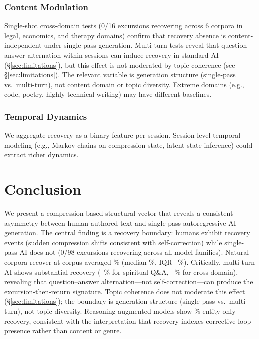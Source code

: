 \documentclass[final]{clv2025}
\begin{document}
\subsubsection{Content Modulation}

Single-shot cross-domain tests (0/16 excursions recovering across 6 corpora in legal, economics, and therapy domains) confirm that recovery absence is content-independent under single-pass generation. Multi-turn tests reveal that question--answer alternation within sessions can induce recovery in standard AI (\S\ref{sec:limitations}), but this effect is not moderated by topic coherence (see \S\ref{sec:limitations}). The relevant variable is generation structure (single-pass vs.\ multi-turn), not content domain or topic diversity. Extreme domains (e.g., code, poetry, highly technical writing) may have different baselines.

\subsubsection{Temporal Dynamics}

We aggregate recovery as a binary feature per session. Session-level temporal modeling (e.g., Markov chains on compression state, latent state inference) could extract richer dynamics.


\section{Conclusion}

We present a compression-based structural vector that reveals a consistent asymmetry between human-authored text and single-pass autoregressive AI generation. The central finding is a recovery boundary: humans exhibit recovery events (sudden compression shifts consistent with self-correction) while single-pass AI does not (0/98 excursions recovering across all model families). Natural corpora recover at corpus-averaged \recNatCorpusAvg\% (median \recNatMedian\%, IQR \recNatIQRlo--\recNatIQRhi\%). Critically, multi-turn AI shows substantial recovery (\recClaudeMT--\recGPTMT\% for spiritual Q\&A, \recMTXdomMin--\recMTXdomMax\% for cross-domain), revealing that question--answer alternation---not self-correction---can produce the excursion-then-return signature. Topic coherence does not moderate this effect (\S\ref{sec:limitations}); the boundary is generation structure (single-pass vs.\ multi-turn), not topic diversity. Reasoning-augmented models show \recReasoningEntity\% entity-only recovery, consistent with the interpretation that recovery indexes corrective-loop presence rather than content or genre.
\end{document}
